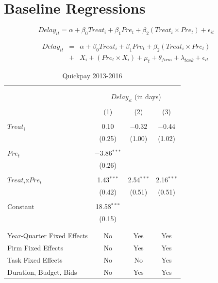 \documentclass[
]{article}
\begin{document}
\hypertarget{baseline-regressions}{%
\section{Baseline Regressions}\label{baseline-regressions}}

\[ Delay_{it} = \alpha+\beta_0 Treat_i + \beta_1 Pre_t + \beta_2 (Treat_i \times Pre_t) + \epsilon_{it}\]

\[ \begin{aligned} Delay_{it} &=& \alpha+\beta_0 Treat_i + \beta_1 Pre_t + \beta_2 (Treat_i \times Pre_t)\\
&+&  X_i + (Pre_t \times X_i) + \mu_t + \theta_{firm} + \lambda_{task}+ \epsilon_{it}
\end{aligned}\]

\begin{table}[H] \centering 
  \caption{Quickpay 2013-2016} 
  \label{} 
\small 
\begin{tabular}{@{\extracolsep{-2pt}}lccc} 
\\[-1.8ex]\hline 
\hline \\[-1.8ex] 
\\[-1.8ex] & \multicolumn{3}{c}{$Delay_{it}$ (in days)} \\ 
\\[-1.8ex] & (1) & (2) & (3)\\ 
\hline \\[-1.8ex] 
 $Treat_i$ & 0.10 & $-$0.32 & $-$0.44 \\ 
  & (0.25) & (1.00) & (1.02) \\ 
  & & & \\ 
 $Pre_t$ & $-$3.86$^{***}$ &  &  \\ 
  & (0.26) &  &  \\ 
  & & & \\ 
 $Treat_i$x$Pre_t$ & 1.43$^{***}$ & 2.54$^{***}$ & 2.16$^{***}$ \\ 
  & (0.42) & (0.51) & (0.51) \\ 
  & & & \\ 
 Constant & 18.58$^{***}$ &  &  \\ 
  & (0.15) &  &  \\ 
  & & & \\ 
\hline \\[-1.8ex] 
Year-Quarter Fixed Effects & No & Yes & Yes \\ 
Firm Fixed Effects & No & Yes & Yes \\ 
Task Fixed Effects & No & No & Yes \\ 
Duration, Budget, Bids & No & Yes & Yes \\ 

\end{tabular}
\end{table}
\end{document}

